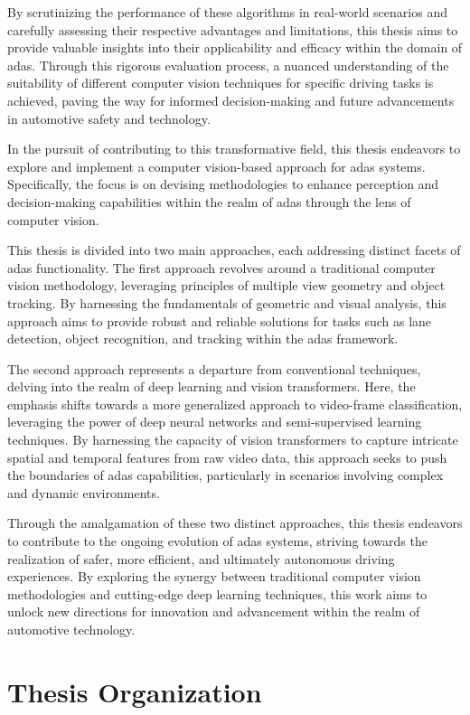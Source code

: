 By scrutinizing the performance of these algorithms in real-world scenarios and carefully assessing their respective advantages and limitations, this thesis aims to provide valuable insights into their applicability and efficacy within the domain of \ac{adas}. 
Through this rigorous evaluation process, a nuanced understanding of the suitability of different computer vision techniques for specific driving tasks is achieved, paving the way for informed decision-making and future advancements in automotive safety and technology.

In the pursuit of contributing to this transformative field, this thesis endeavors to explore and implement a computer vision-based approach for \ac{adas} systems. 
Specifically, the focus is on devising methodologies to enhance perception and decision-making capabilities within the realm of \ac{adas} through the lens of computer vision.

This thesis is divided into two main approaches, each addressing distinct facets of \ac{adas} functionality.
The first approach revolves around a traditional computer vision methodology, leveraging principles of multiple view geometry and object tracking. 
By harnessing the fundamentals of geometric and visual analysis, this approach aims to provide robust and reliable solutions for tasks such as lane detection, object recognition, and tracking within the \ac{adas} framework.

The second approach represents a departure from conventional techniques, delving into the realm of deep learning and vision transformers. 
Here, the emphasis shifts towards a more generalized approach to video-frame classification, leveraging the power of deep neural networks and semi-supervised learning techniques. 
By harnessing the capacity of vision transformers to capture intricate spatial and temporal features from raw video data, this approach seeks to push the boundaries of \ac{adas} capabilities, particularly in scenarios involving complex and dynamic environments.

Through the amalgamation of these two distinct approaches, this thesis endeavors to contribute to the ongoing evolution of \ac{adas} systems, striving towards the realization of safer, more efficient, and ultimately autonomous driving experiences. 
By exploring the synergy between traditional computer vision methodologies and cutting-edge deep learning techniques, this work aims to unlock new directions for innovation and advancement within the realm of automotive technology.

\section{Thesis Organization}
\lipsum[1-2]
